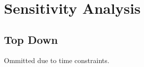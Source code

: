 \section{Sensitivity Analysis}\label{sec:sensitivity_analysis}
\subsection{Top Down}\label{subsec:sensitivity_analysis_top_down}
Ommitted due to time constraints.